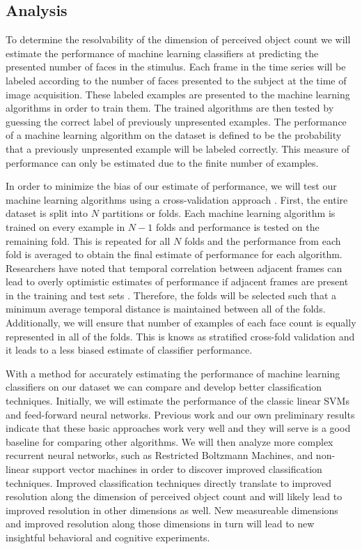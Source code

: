 \documentclass[12pt]{article}
\begin{document}
\subsection{Analysis}
To determine the resolvability of the dimension of perceived object count we will estimate the performance of machine learning classifiers at predicting the presented number of faces in the stimulus.
Each frame in the time series will be labeled according to the number of faces presented to the subject at the time of image acquisition.
These labeled examples are presented to the machine learning algorithms in order to train them.
The trained algorithms are then tested by guessing the correct label of previously unpresented examples.
The performance of a machine learning algorithm on the dataset is defined to be the probability that a previously unpresented example will be labeled correctly.
This measure of performance can only be estimated due to the finite number of examples.

In order to minimize the bias of our estimate of performance, we will test our machine learning algorithms using a cross-validation approach \cite{Kohavi1995}.
First, the entire dataset is split into $N$ partitions or folds.
Each machine learning algorithm is trained on every example in $N-1$ folds and performance is tested on the remaining fold.
This is repeated for all $N$ folds and the performance from each fold is averaged to obtain the final estimate of performance for each algorithm.
Researchers have noted that temporal correlation between adjacent frames can lead to overly optimistic estimates of performance if adjacent frames are present in the training and test sets \cite{Pereira2009}.
Therefore, the folds will be selected such that a minimum average temporal distance is maintained between all of the folds.
Additionally, we will ensure that number of examples of each face count is equally represented in all of the folds.
This is knows as stratified cross-fold validation \cite{Kohavi1995} and it leads to a less biased estimate of classifier performance.

With a method for accurately estimating the performance of machine learning classifiers on our dataset we can compare and develop better classification techniques.
Initially, we will estimate the performance of the classic linear SVMs and feed-forward neural networks.
Previous work and our own preliminary results indicate that these basic approaches work very well and they will serve is a good baseline for comparing other algorithms.
We will then analyze more complex recurrent neural networks, such as Restricted Boltzmann Machines, and non-linear support vector machines in order to discover improved classification techniques.
Improved classification techniques directly translate to improved resolution along the dimension of perceived object count and will likely lead to improved resolution in other dimensions as well.
New measureable dimensions and improved resolution along those dimensions in turn will lead to new insightful behavioral and cognitive experiments.


\end{document}
